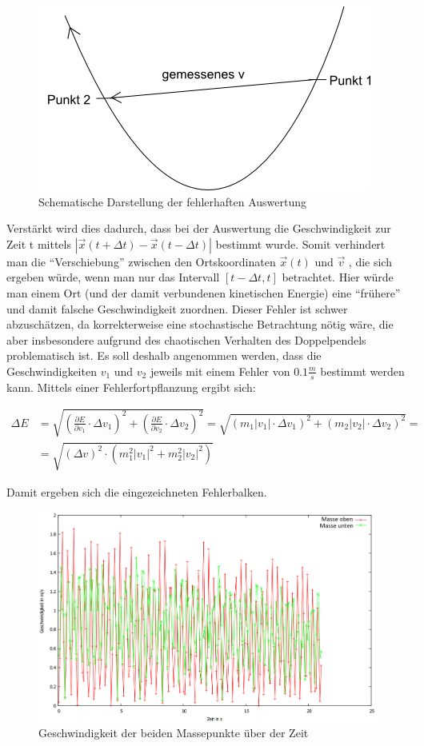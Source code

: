 \begin{figure}
        \includegraphics[width=.7\textwidth]{images/grafik1.png}
\caption{Schematische Darstellung der fehlerhaften Auswertung}
\label{grafik1}
\end{figure}


Verstärkt wird dies dadurch, dass bei der Auswertung die Geschwindigkeit zur Zeit t mittels $ |\vec{x}(t+\Delta t) - \vec{x}(t-\Delta t)| $ bestimmt wurde. Somit verhindert man die \enquote{Verschiebung} zwischen den Ortskoordinaten $  \vec{x} (t) $ und $ \vec{v} $ , die sich ergeben würde, wenn man nur das Intervall $ [t - \Delta t, t] $ betrachtet. Hier würde man einem Ort (und der damit verbundenen kinetischen Energie) eine \enquote{frühere} und damit falsche Geschwindigkeit zuordnen. 
Dieser Fehler ist schwer abzuschätzen, da korrekterweise eine stochastische Betrachtung nötig wäre, die aber insbesondere aufgrund des chaotischen Verhalten des Doppelpendels problematisch ist. 
Es soll deshalb angenommen werden, dass die Geschwindigkeiten $ v_1 $ und $ v_2 $ jeweils mit einem Fehler von $ 0.1 \frac{m}{s} $ bestimmt werden kann. Mittels einer Fehlerfortpflanzung ergibt sich: 

\begin{align}
\Delta E &= \sqrt{(\frac{\partial E}{\partial v_1} \cdot \Delta v_1)^2 + (\frac{\partial E}{\partial v_2} \cdot \Delta v_2)^2} = \sqrt{(m_1 |v_1| \cdot \Delta v_1)^2 + (m_2 |v_2| \cdot \Delta v_2)^2}= \nonumber \\ &= \sqrt{(\Delta v)^2 \cdot (m_1^2 |v_1|^2 + m_2^2 |v_2|^2)}
\end{align}

Damit ergeben sich die eingezeichneten Fehlerbalken. 


\begin{figure}
        \includegraphics[width=.9\textwidth]{images/v_ueber_t_neu.png}
\caption{Geschwindigkeit der beiden Massepunkte über der Zeit}
\label{v_ueber_t}
\end{figure}


